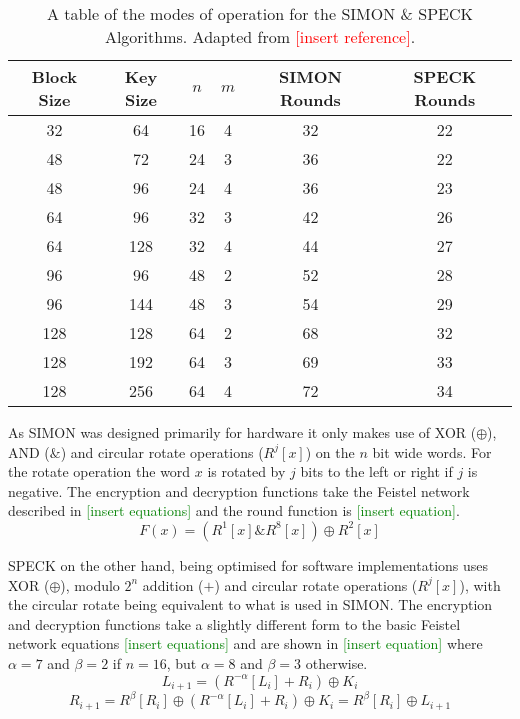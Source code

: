 \documentclass[12pt,twoside,a4paper]{report}
\begin{document}
        \begin{table}[H]
        \centering
        \begin{tabular}{||c|c|c|c|c|c||}
            \hline \hline
            Block Size & Key Size & $n$ & $m$ & SIMON Rounds & SPECK Rounds \\
            \hline \hline
            32 & 64 & 16 & 4 & 32 & 22 \\
            \hline
            48 & 72 & 24 & 3 & 36 & 22 \\
            48 & 96 & 24 & 4 & 36 & 23 \\
            \hline
            64 & 96 & 32 & 3 & 42 & 26 \\
            64 & 128 & 32 & 4 & 44 & 27 \\
            \hline
            96 & 96 & 48 & 2 & 52 & 28 \\
            96 & 144 & 48 & 3 & 54 & 29 \\
            \hline
            128 & 128 & 64 & 2 & 68 & 32 \\
            128 & 192 & 64 & 3 & 69 & 33 \\
            128 & 256 & 64 & 4 & 72 & 34 \\
            \hline \hline
        \end{tabular}
        \caption{A table of the modes of operation for the SIMON \& SPECK Algorithms. Adapted from \textcolor{red}{[insert reference]}.}
        \label{table:S+S}
        \end{table}
    
    As SIMON was designed primarily for hardware it only makes use of XOR ($\oplus$), AND ($\&$) and circular rotate operations ($R^j[x]$) on the $n$ bit wide words. For the rotate operation the word $x$ is rotated by $j$ bits to the left or right if $j$ is negative. The encryption and decryption functions take the Feistel network described in \textcolor{green}{[insert equations]} and the round function is \textcolor{green}{[insert equation]}.
    \[F(x) = (R^1[x]\&R^8[x]) \oplus R^2[x]\]
    
    SPECK on the other hand, being optimised for software implementations uses XOR ($\oplus$), modulo $2^n$ addition ($+$) and circular rotate operations ($R^j[x]$), with the circular rotate being equivalent to what is used in SIMON. The encryption and decryption functions take a slightly different form to the basic Feistel network equations \textcolor{green}{[insert equations]} and are shown in \textcolor{green}{[insert equation]} where $\alpha = 7$ and $\beta = 2$ if $n = 16$, but $\alpha = 8$ and $\beta = 3$ otherwise.
    \[L_{i+1} = (R^{-\alpha}[L_i] + R_i) \oplus K_i\]
    \[R_{i+1} = R^{\beta}[R_i] \oplus (R^{-\alpha}[L_i] + R_i) \oplus K_i = R^{\beta}[R_i] \oplus L_{i+1}\]
    
\end{document}
